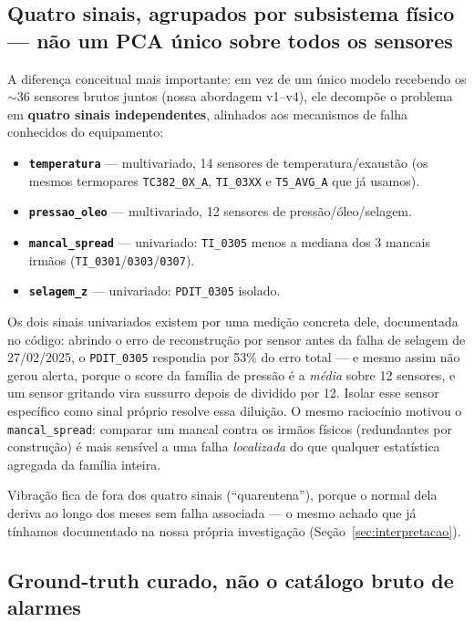 \documentclass[11pt,a4paper]{article}
\begin{document}
\subsection{Quatro sinais, agrupados por subsistema físico --- não um
PCA único sobre todos os sensores}

A diferença conceitual mais importante: em vez de um único modelo
recebendo os $\sim$36 sensores brutos juntos (nossa abordagem v1--v4),
ele decompõe o problema em \textbf{quatro sinais independentes},
alinhados aos mecanismos de falha conhecidos do equipamento:

\begin{itemize}[leftmargin=1.4em]
  \item \textbf{\texttt{temperatura}} --- multivariado, 14 sensores de
  temperatura/exaustão (os mesmos termopares \texttt{TC382\_0X\_A},
  \texttt{TI\_03XX} e \texttt{T5\_AVG\_A} que já usamos).
  \item \textbf{\texttt{pressao\_oleo}} --- multivariado, 12 sensores de
  pressão/óleo/selagem.
  \item \textbf{\texttt{mancal\_spread}} --- univariado: \texttt{TI\_0305}
  menos a mediana dos 3 mancais irmãos (\texttt{TI\_0301}/\texttt{0303}/\texttt{0307}).
  \item \textbf{\texttt{selagem\_z}} --- univariado: \texttt{PDIT\_0305}
  isolado.
\end{itemize}

Os dois sinais univariados existem por uma medição concreta dele,
documentada no código: abrindo o erro de reconstrução por sensor antes
da falha de selagem de 27/02/2025, o \texttt{PDIT\_0305} respondia por
53\% do erro total --- e mesmo assim não gerou alerta, porque o score da
família de pressão é a \emph{média} sobre 12 sensores, e um sensor
gritando vira sussurro depois de dividido por 12. Isolar esse sensor
específico como sinal próprio resolve essa diluição. O mesmo raciocínio
motivou o \texttt{mancal\_spread}: comparar um mancal contra os irmãos
físicos (redundantes por construção) é mais sensível a uma falha
\emph{localizada} do que qualquer estatística agregada da família
inteira.

Vibração fica de fora dos quatro sinais (``quarentena''), porque o
normal dela deriva ao longo dos meses sem falha associada --- o mesmo
achado que já tínhamos documentado na nossa própria investigação
(Seção~\ref{sec:interpretacao}).

\subsection{Ground-truth curado, não o catálogo bruto de alarmes}
\label{sec:ground-truth}
\end{document}
